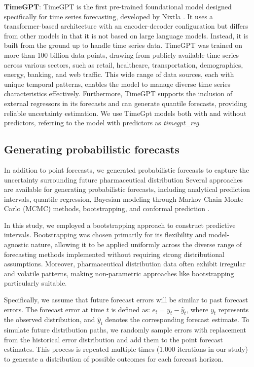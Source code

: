\documentclass[
  authoryear,
  preprint,
  3p]{elsarticle}
\begin{document}
\textbf{TimeGPT}: TimeGPT is the first pre-trained foundational model
designed specifically for time series forecasting, developed by Nixtla
\citep{garza2023timegpt}. It uses a transformer-based architecture with
an encoder-decoder configuration but differs from other models in that
it is not based on large language models. Instead, it is built from the
ground up to handle time series data. TimeGPT was trained on more than
100 billion data points, drawing from publicly available time series
across various sectors, such as retail, healthcare, transportation,
demographics, energy, banking, and web traffic. This wide range of data
sources, each with unique temporal patterns, enables the model to manage
diverse time series characteristics effectively. Furthermore, TimeGPT
supports the inclusion of external regressors in its forecasts and can
generate quantile forecasts, providing reliable uncertainty estimation.
We use TimeGpt models both with and without predictors, referring to the
model with predictors as \emph{timegpt\_reg}.

\subsection{Generating probabilistic
forecasts}\label{generating-probabilistic-forecasts}

In addition to point forecasts, we generated probabilistic forecasts to
capture the uncertainty surrounding future pharmaceutical distribution
Several approaches are available for generating probabilistic forecasts,
including analytical prediction intervals, quantile regression, Bayesian
modeling through Markov Chain Monte Carlo (MCMC) methods, bootstrapping,
and conformal prediction \citep{wang2023}.

In this study, we employed a bootstrapping approach to construct
predictive intervals. Bootstrapping was chosen primarily for its
flexibility and model-agnostic nature, allowing it to be applied
uniformly across the diverse range of forecasting methods implemented
without requiring strong distributional assumptions. Moreover,
pharmaceutical distribution data often exhibit irregular and volatile
patterns, making non-parametric approaches like bootstrapping
particularly suitable.

Specifically, we assume that future forecast errors will be similar to
past forecast errors. The forecast error at time \(t\) is defined as:
\(e_t = y_t - \hat{y}_t\), where \(y_t\) represents the observed
distribution, and \(\hat{y}_t\) denotes the corresponding forecast
estimate. To simulate future distribution paths, we randomly sample
errors with replacement from the historical error distribution and add
them to the point forecast estimates. This process is repeated multiple
times (1,000 iterations in our study) to generate a distribution of
possible outcomes for each forecast horizon.
\end{document}

